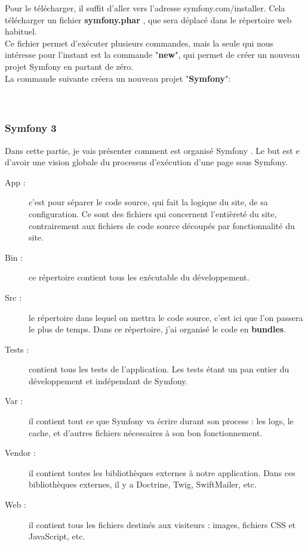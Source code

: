 \documentclass[12pt]{article}
\begin{document}
Pour le télécharger, il suffit d'aller vers l'adresse  symfony.com/installer. Cela  télécharger un fichier \textbf{symfony.phar} , que sera déplacé dans le répertoire web habituel. \\
Ce fichier permet d'exécuter plusieurs commandes, mais la seule qui nous intéresse pour l'instant est la commande "\textbf{new}", qui permet de créer un nouveau projet Symfony en partant de zéro.\\
La commande suivante créera un nouveau projet  "\textbf{Symfony}":\\
\\
 \\


\subsubsection{Symfony 3}
Dans cette partie, je vais présenter comment est organisé Symfony . Le but est e d'avoir une vision globale du processus d'exécution d'une page sous Symfony.\\
\begin{description}
\item[App :]  c'est  pour séparer le code source, qui fait la logique du site, de sa configuration. Ce sont des fichiers qui concernent l'entièreté du site, contrairement aux fichiers de code source  découpés par fonctionnalité du site.
\item[Bin :] ce répertoire contient tous les exécutable du développement.
\item[Src :] le répertoire dans lequel on mettra le code source, c'est ici que l'on passera le plus de temps. Dans ce répertoire, j'ai organisé le code en \textbf{bundles}.
\item[Tests :] contient tous les tests de  l'application. Les tests étant un pan entier du développement et indépendant de Symfony.
\item[Var :] il contient tout ce que Symfony va écrire durant son process : les logs, le cache, et d'autres fichiers nécessaires à son bon fonctionnement.
\item[Vendor :] il contient toutes les bibliothèques externes à notre application. Dans ces bibliothèques externes, il y a Doctrine, Twig, SwiftMailer, etc.
\item[Web :] il contient tous les fichiers destinés aux visiteurs : images, fichiers CSS et JavaScript, etc. 

\end{description} \\ \\
\end{document}
